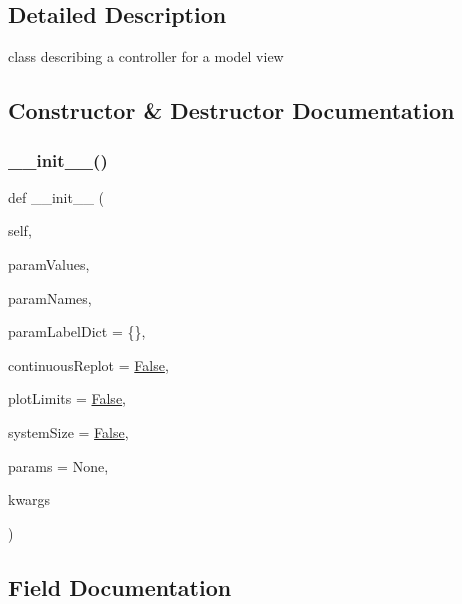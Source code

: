 \subsection{Detailed Description}
class describing a controller for a model view 

\subsection{Constructor \& Destructor Documentation}
\mbox{\label{class_mu_mo_t_1_1_mu_mo_t_1_1_mu_mo_tcontroller_a2b7e9681302740635162f2f8f0dddebf}} 
\subsubsection{\texorpdfstring{\+\_\+\+\_\+init\+\_\+\+\_\+()}{\_\_init\_\_()}}
{\footnotesize\ttfamily def \+\_\+\+\_\+init\+\_\+\+\_\+ (\begin{DoxyParamCaption}\item[{}]{self,  }\item[{}]{param\+Values,  }\item[{}]{param\+Names,  }\item[{}]{param\+Label\+Dict = {\ttfamily \{\}},  }\item[{}]{continuous\+Replot = {\ttfamily \hyperlink{namespace_mu_mo_t_1_1_mu_mo_t_a36cde68b055f3f2ee671020af4ccf4e2}{False}},  }\item[{}]{plot\+Limits = {\ttfamily \hyperlink{namespace_mu_mo_t_1_1_mu_mo_t_a36cde68b055f3f2ee671020af4ccf4e2}{False}},  }\item[{}]{system\+Size = {\ttfamily \hyperlink{namespace_mu_mo_t_1_1_mu_mo_t_a36cde68b055f3f2ee671020af4ccf4e2}{False}},  }\item[{}]{params = {\ttfamily None},  }\item[{}]{kwargs }\end{DoxyParamCaption})}



\subsection{Field Documentation}
\mbox{\label{class_mu_mo_t_1_1_mu_mo_t_1_1_mu_mo_tcontroller_ae7a084d9f77bbda4a99577633ef002ce}} 
